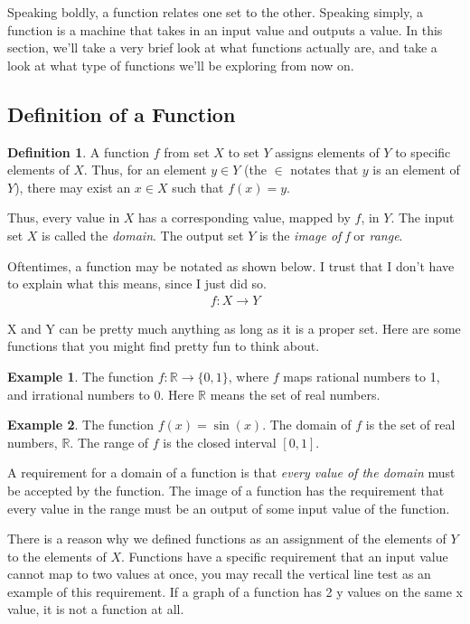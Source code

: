 \documentclass{scrbook}
\theoremstyle{definition}
\newtheorem{definition}{Definition}[section]
\newtheorem{example}{Example}
\newcommand{\R}{\mathbb{R}}
\begin{document}
Speaking boldly, a function relates one set to the other. Speaking simply, a function is a machine that takes in an input value and outputs a value. In this section, we'll take a very brief look at what functions actually are, and take a look at what type of functions we'll be exploring from now on. 

\subsection{Definition of a Function}

\begin{definition}
A function $f$ from set $X$ to set $Y$ assigns elements of $Y$ to specific elements of $X$. Thus, for an element $y \in Y$ (the $\in$ notates that $y$ is an element of $Y$), there may exist an $x \in X$ such that $f(x) = y$. 
\end{definition}

Thus, every value in $X$ has a corresponding value, mapped by $f$, in $Y$. The input set $X$ is called the \textit{domain}. The output set $Y$ is the \textit{image of f} or \textit{range}.

Oftentimes, a function may be notated as shown below. I trust that I don't have to explain what this means, since I just did so.
\begin{align*}
    f: X \longrightarrow Y
\end{align*}

X and Y can be pretty much anything as long as it is a proper set. Here are some functions that you might find pretty fun to think about. 

\begin{example}
The function $f: \R \longrightarrow \{0, 1\}$, where $f$ maps rational numbers to 1, and irrational numbers to 0. Here $\R$ means the set of real numbers.
\end{example}

\begin{example}
The function $f(x) = \sin(x)$. The domain of $f$ is the set of real numbers, $\R$. The range of $f$ is the closed interval $[0, 1]$. 
\end{example}

A requirement for a domain of a function is that \textit{every value of the domain} must be accepted by the function. The image of a function has the requirement that every value in the range must be an output of some input value of the function. 

There is a reason why we defined functions as an assignment of the elements of $Y$ to the elements of $X$. Functions have a specific requirement that an input value cannot map to two values at once, you may recall the vertical line test as an example of this requirement. If a graph of a function has 2 y values on the same x value, it is not a function at all.
\end{document}
